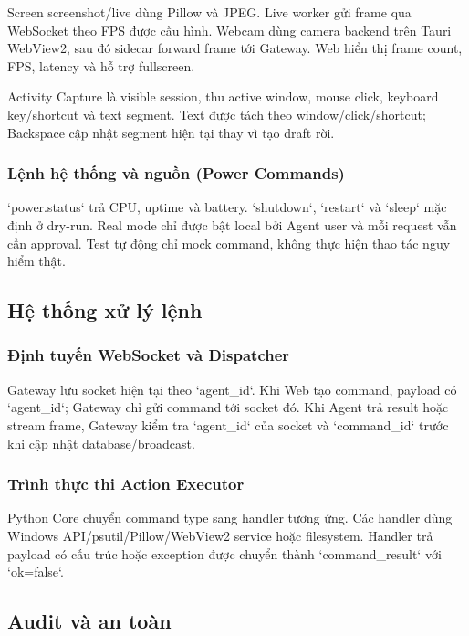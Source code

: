 \documentclass[12pt,a4paper]{article}
\begin{document}
Screen screenshot/live dùng Pillow và JPEG. Live worker gửi frame qua WebSocket theo FPS được cấu hình. Webcam dùng camera backend trên Tauri WebView2, sau đó sidecar forward frame tới Gateway. Web hiển thị frame count, FPS, latency và hỗ trợ fullscreen.

Activity Capture là visible session, thu active window, mouse click, keyboard key/shortcut và text segment. Text được tách theo window/click/shortcut; Backspace cập nhật segment hiện tại thay vì tạo draft rời.

\subsubsection{Lệnh hệ thống và nguồn (Power Commands)}

`power.status` trả CPU, uptime và battery. `shutdown`, `restart` và `sleep` mặc định ở dry-run. Real mode chỉ được bật local bởi Agent user và mỗi request vẫn cần approval. Test tự động chỉ mock command, không thực hiện thao tác nguy hiểm thật.

\subsection{Hệ thống xử lý lệnh}

\subsubsection{Định tuyến WebSocket và Dispatcher}

Gateway lưu socket hiện tại theo `agent_id`. Khi Web tạo command, payload có `agent_id`; Gateway chỉ gửi command tới socket đó. Khi Agent trả result hoặc stream frame, Gateway kiểm tra `agent_id` của socket và `command_id` trước khi cập nhật database/broadcast.

\subsubsection{Trình thực thi Action Executor}

Python Core chuyển command type sang handler tương ứng. Các handler dùng Windows API/psutil/Pillow/WebView2 service hoặc filesystem. Handler trả payload có cấu trúc hoặc exception được chuyển thành `command_result` với `ok=false`.

\subsection{Audit và an toàn}
\end{document}
